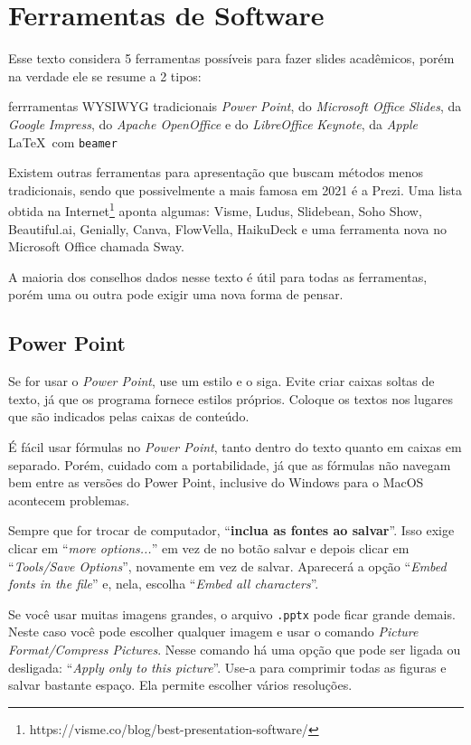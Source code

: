\section{Ferramentas de Software}
\label{sec:ferramentas}

Esse texto considera 5 ferramentas possíveis para fazer slides acadêmicos, porém na verdade ele se resume a 2 tipos:
\begin{outline}
    \1 ferrramentas WYSIWYG tradicionais
    \2 \textit{Power Point}, do \textit{Microsoft Office}
    \2 \textit{Slides}, da \textit{Google}
    \2 \textit{Impress}, do \textit{Apache OpenOffice} e do \textit{LibreOffice}
    \2 \textit{Keynote}, da \textit{Apple}
    \1 \LaTeX\  com \texttt{beamer}
\end{outline}

Existem outras ferramentas para apresentação que buscam métodos menos tradicionais, sendo que possivelmente a mais famosa em 2021 é a Prezi. Uma lista obtida na Internet\footnote{https://visme.co/blog/best-presentation-software/} aponta algumas: Visme, Ludus, Slidebean, Soho Show, Beautiful.ai, Genially, Canva, FlowVella, HaikuDeck e uma ferramenta nova no Microsoft Office chamada Sway.

A maioria dos conselhos dados nesse texto é útil para todas as ferramentas, porém uma ou outra pode exigir uma nova forma de pensar.

\subsection{Power Point}

Se for usar o \textit{Power Point}, use um estilo e o siga. Evite criar caixas soltas de texto, já que os programa fornece estilos próprios. Coloque os textos nos lugares que são indicados pelas caixas de conteúdo.

É fácil usar fórmulas no \textit{Power Point}, tanto dentro do texto quanto em caixas em separado. Porém, cuidado com a portabilidade, já que as fórmulas não navegam bem entre as versões do Power Point, inclusive do Windows para o MacOS acontecem problemas.

Sempre que for trocar de computador, ``\textbf{inclua as fontes ao salvar}''. Isso exige clicar em ``\textit{more options...}'' em vez de no botão salvar e depois clicar em ``\textit{Tools/Save Options}'', novamente em vez de salvar. Aparecerá a opção ``\textit{Embed fonts in the file}'' e, nela, escolha ``\textit{Embed all characters}''.

Se você usar muitas imagens grandes, o arquivo \texttt{.pptx} pode ficar grande demais. Neste caso você pode escolher qualquer imagem e usar o comando \textit{Picture Format/Compress Pictures}. Nesse comando há uma opção que pode ser ligada ou desligada: ``\textit{Apply only to this picture}''. Use-a para comprimir todas as figuras e salvar bastante espaço. Ela permite escolher vários resoluções.

